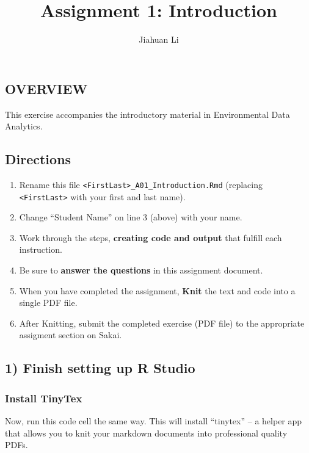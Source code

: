 \documentclass[
]{article}
\title{Assignment 1: Introduction}
\author{Jiahuan Li}
\date{}
\providecommand{\tightlist}{%
  \setlength{\itemsep}{0pt}\setlength{\parskip}{0pt}}
\begin{document}
\maketitle

\hypertarget{overview}{%
\subsection{OVERVIEW}\label{overview}}

This exercise accompanies the introductory material in Environmental
Data Analytics.

\hypertarget{directions}{%
\subsection{Directions}\label{directions}}

\begin{enumerate}
\def\labelenumi{\arabic{enumi}.}
\tightlist
\item
  Rename this file
  \texttt{\textless{}FirstLast\textgreater{}\_A01\_Introduction.Rmd}
  (replacing \texttt{\textless{}FirstLast\textgreater{}} with your first
  and last name).
\item
  Change ``Student Name'' on line 3 (above) with your name.
\item
  Work through the steps, \textbf{creating code and output} that fulfill
  each instruction.
\item
  Be sure to \textbf{answer the questions} in this assignment document.
\item
  When you have completed the assignment, \textbf{Knit} the text and
  code into a single PDF file.
\item
  After Knitting, submit the completed exercise (PDF file) to the
  appropriate assigment section on Sakai.
\end{enumerate}

\hypertarget{finish-setting-up-r-studio}{%
\subsection{1) Finish setting up R
Studio}\label{finish-setting-up-r-studio}}

\hypertarget{install-tinytex}{%
\subsubsection{Install TinyTex}\label{install-tinytex}}

Now, run this code cell the same way. This will install ``tinytex'' -- a
helper app that allows you to knit your markdown documents into
professional quality PDFs.
\end{document}
